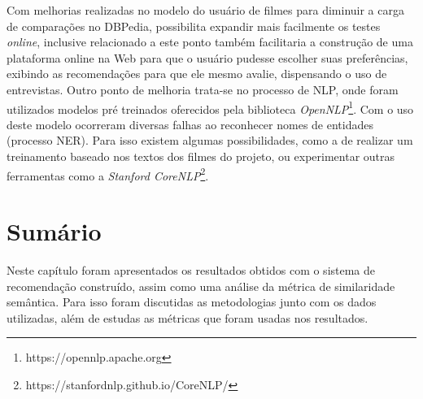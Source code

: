 Com melhorias realizadas no modelo do usuário de filmes para diminuir a carga de comparações no DBPedia, possibilita expandir mais facilmente os testes \textit{online}, inclusive relacionado a este ponto também facilitaria a construção de uma plataforma online na Web para que o usuário pudesse escolher suas preferências, exibindo as recomendações para que ele mesmo avalie, dispensando o uso de entrevistas. Outro ponto de melhoria trata-se no processo de \ac{NLP}, onde foram utilizados modelos pré treinados oferecidos pela biblioteca \textit{OpenNLP}\footnote{https://opennlp.apache.org}. Com o uso deste modelo ocorreram diversas falhas ao reconhecer nomes de entidades (processo \ac{NER}). Para isso existem algumas possibilidades, como a de realizar um treinamento baseado nos textos dos filmes do projeto, ou experimentar outras ferramentas como a \textit{Stanford CoreNLP}\footnote{https://stanfordnlp.github.io/CoreNLP/}.

\section{Sumário}

Neste capítulo foram apresentados os resultados obtidos com o sistema de recomendação construído, assim como uma análise da métrica de similaridade semântica. Para isso foram discutidas as metodologias junto com os dados utilizadas, além de estudas as métricas que foram usadas nos resultados.